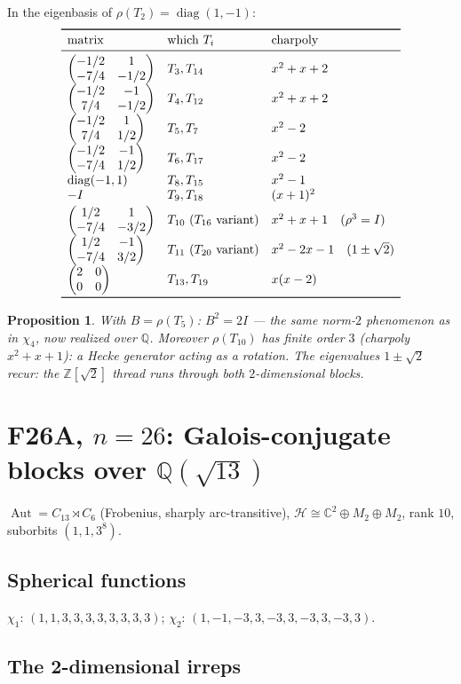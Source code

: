 \documentclass[11pt]{article}
\newtheorem{proposition}[theorem]{Proposition}
\theoremstyle{remark}
\newcommand{\C}{\mathbb{C}}
\newcommand{\Q}{\mathbb{Q}}
\newcommand{\Z}{\mathbb{Z}}
\newcommand{\T}[1]{T_{#1}}
\newcommand{\rh}[1]{\rho(T_{#1})}
\newcommand{\mat}[4]{\begin{pmatrix} #1 & #2 \\ #3 & #4 \end{pmatrix}}
\begin{document}
In the eigenbasis of $\rho(\T2)=\operatorname{diag}(1,-1)$:
\[
\begin{array}{lll}
\toprule
\text{matrix} & \text{which }\T i & \text{charpoly}\\
\midrule
\mat{-1/2}{1}{-7/4}{-1/2} & \T3,\T{14} & x^2+x+2\\[2pt]
\mat{-1/2}{-1}{7/4}{-1/2} & \T4,\T{12} & x^2+x+2\\[2pt]
\mat{-1/2}{1}{7/4}{1/2} & \T5,\T7 & x^2-2\\[2pt]
\mat{-1/2}{-1}{-7/4}{1/2} & \T6,\T{17} & x^2-2\\[2pt]
\operatorname{diag}(-1,1) & \T8,\T{15} & x^2-1\\
-I & \T9,\T{18} & (x+1)^2\\[2pt]
\mat{1/2}{1}{-7/4}{-3/2} & \T{10}\ (\T{16}\ \text{variant}) & x^2+x+1\quad(\rho^3=I)\\[2pt]
\mat{1/2}{-1}{-7/4}{3/2} & \T{11}\ (\T{20}\ \text{variant}) & x^2-2x-1\quad(1\pm\sqrt2)\\[2pt]
\mat{2}{0}{0}{0} & \T{13},\T{19} & x(x-2)\\
\bottomrule
\end{array}
\]

\begin{proposition}\label{prop:psl27c}
With $B=\rh5$: $\boxed{B^2=2I}$ --- the same norm-$2$ phenomenon as in
$\chi_4$, now realized over $\Q$. Moreover $\rho(\T{10})$ has
\emph{finite order $3$} (charpoly $x^2+x+1$): a Hecke generator acting as
a rotation. The eigenvalues $1\pm\sqrt2$ recur: the $\Z[\sqrt2]$ thread
runs through both $2$-dimensional blocks.
\end{proposition}

\section{F26A, $n=26$: Galois-conjugate blocks over $\Q(\sqrt{13})$}
\label{sec:f26a}

$\operatorname{Aut}=C_{13}\rtimes C_6$ (Frobenius, sharply arc-transitive),
$\mathcal H\cong\C^2\oplus M_2\oplus M_2$, rank $10$, suborbits
$(1,1,3^8)$.

\subsection{Spherical functions}
$\chi_1$: $(1,1,3,3,3,3,3,3,3,3)$;\quad
$\chi_2$: $(1,-1,-3,3,-3,3,-3,3,-3,3)$.

\subsection{The 2-dimensional irreps}
\end{document}
